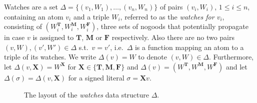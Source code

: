 \documentclass{vutinfth} %
\theoremstyle{example}
\theoremstyle{definition}
\theoremstyle{theorem}
\theoremstyle{lemma}
\theoremstyle{corollary}
\newcommand{\bT}{\mathbf{T}}
\newcommand{\bM}{\mathbf{M}}
\newcommand{\bF}{\mathbf{F}}
\newcommand{\bX}{\mathbf{X}}
\newcommand{\thrice}{{\{\bT, \bM, \bF \}}}
\begin{document}

Watches are a set $\Delta = \{ (v_1, W_1), \ldots, (v_n, W_n) \}$ of pairs $(v_i, W_i)$, $1 \leq i \leq n$, containing an atom $v_i$ and a triple $W_i$, referred to as the \emph{watches for $v_i$}, consisting of $(W_i^\mathbf{T}, W_i^\mathbf{M}, W_i^\mathbf{F})$, three sets of nogoods that potentially propagate in case $v$ is assigned to $\mathbf{T}$, $\mathbf{M}$ or $\mathbf{F}$ respectively. Also there are no two pairs $(v, W), (v', W') \in \Delta$ s.t.~$v = v'$, i.e.~$\Delta$ is a function mapping an atom to a triple of its watches. We write $\Delta(v) = W$ to denote $(v, W) \in \Delta$. Furthermore, let $\Delta(v, \bX) = W^\bX$ for $\bX \in \thrice$ and $\Delta(v) = (W^\mathbf{T}, W^\mathbf{M}, W^\mathbf{F})$ and let $\Delta(\sigma) = \Delta(v, \bX)$ for a signed literal $\sigma = \bX v$.

\begin{figure}[h]
  \centering
{}
  \caption{The layout of the \emph{watches} data structure $\Delta$.}
  \label{fig:watches} %
\end{figure}
\end{document}
